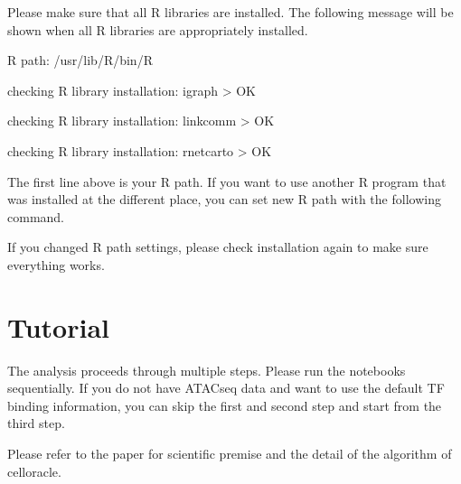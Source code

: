 \documentclass[letterpaper,10pt,english]{sphinxmanual}
\begin{document}
Please make sure that all R libraries are installed. The following message will be shown when all R libraries are appropriately installed.

\begin{DUlineblock}{0em}
\item[] R path: /usr/lib/R/bin/R
\item[] checking R library installation: igraph \sphinxhyphen{}\textgreater{} OK
\item[] checking R library installation: linkcomm \sphinxhyphen{}\textgreater{} OK
\item[] checking R library installation: rnetcarto \sphinxhyphen{}\textgreater{} OK
\end{DUlineblock}

The first line above is your R path. If you want to use another R program that was installed at the different place, you can set new R path with the following command.

\begin{sphinxVerbatim}[commandchars=\\\{\}]
\end{sphinxVerbatim}

If you changed R path settings, please check installation again to make sure everything works.

\begin{sphinxVerbatim}[commandchars=\\\{\}]
\end{sphinxVerbatim}


\section{Tutorial}
\label{\detokenize{tutorials/index:tutorial}}\label{\detokenize{tutorials/index:id1}}\label{\detokenize{tutorials/index::doc}}
The analysis proceeds through multiple steps.
Please run the notebooks sequentially.
If you do not have ATAC\sphinxhyphen{}seq data and want to use the default TF binding information, you can skip the first and second step and start from the third step.

Please refer to the  paper for scientific premise and the detail of the algorithm of celloracle.
\end{document}
